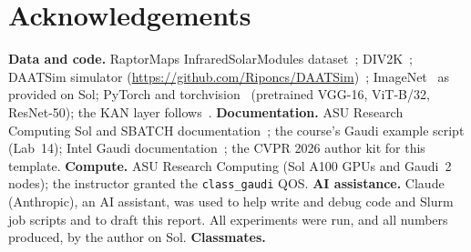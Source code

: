 \documentclass[10pt,twocolumn,letterpaper]{article}
\begin{document}
\section*{Acknowledgements}
\noindent\textbf{Data and code.} RaptorMaps InfraredSolarModules dataset~\cite{millendorf2020pv}; DIV2K~\cite{agustsson2017div2k}; DAATSim simulator (\url{https://github.com/Riponcs/DAATSim})~\cite{saha2025daatsim}; ImageNet~\cite{deng2009imagenet} as provided on Sol; PyTorch and torchvision~\cite{paszke2019pytorch} (pretrained VGG-16, ViT-B/32, ResNet-50); the KAN layer follows~\cite{liu2024kan}.
\textbf{Documentation.} ASU Research Computing Sol and SBATCH documentation~\cite{asurc2025sol}; the course's Gaudi example script (Lab~14); Intel Gaudi documentation~\cite{habana2025docs}; the CVPR 2026 author kit for this template.
\textbf{Compute.} ASU Research Computing (Sol A100 GPUs and Gaudi~2 nodes); the instructor granted the \texttt{class\_gaudi} QOS.
\textbf{AI assistance.} Claude (Anthropic), an AI assistant, was used to help write and debug code and Slurm job scripts and to draft this report. All experiments were run, and all numbers produced, by the author on Sol.
\textbf{Classmates.} 

{
    \small
    
    
}
\end{document}
